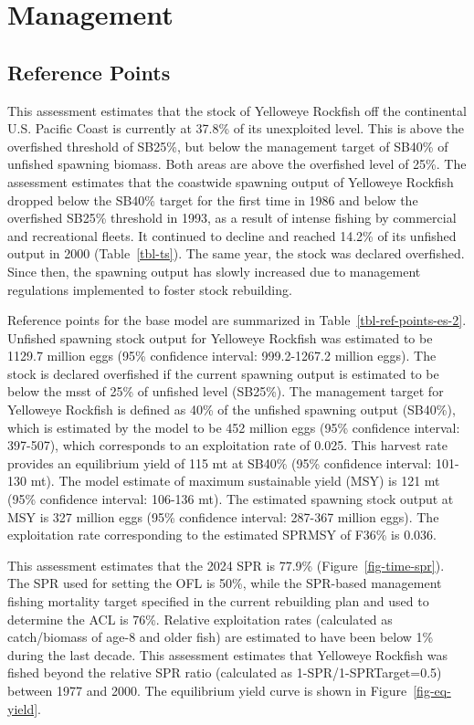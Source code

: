 \documentclass[
]{scrartcl}
\begin{document}
\section{Management}\label{management}

\subsection{Reference Points}\label{reference-points-1}

This assessment estimates that the stock of Yelloweye Rockfish off the
continental U.S. Pacific Coast is currently at 37.8\% of its unexploited
level. This is above the overfished threshold of SB25\%, but below the
management target of SB40\% of unfished spawning biomass. Both areas are
above the overfished level of 25\%. The assessment estimates that the
coastwide spawning output of Yelloweye Rockfish dropped below the SB40\%
target for the first time in 1986 and below the overfished SB25\%
threshold in 1993, as a result of intense fishing by commercial and
recreational fleets. It continued to decline and reached 14.2\% of its
unfished output in 2000 (Table~\ref{tbl-ts}). The same year, the stock
was declared overfished. Since then, the spawning output has slowly
increased due to management regulations implemented to foster stock
rebuilding.

Reference points for the base model are summarized in
Table~\ref{tbl-ref-points-es-2}. Unfished spawning stock output for
Yelloweye Rockfish was estimated to be 1129.7 million eggs (95\%
confidence interval: 999.2-1267.2 million eggs). The stock is declared
overfished if the current spawning output is estimated to be below the
\gls{msst} of 25\% of unfished level (SB25\%). The management target for
Yelloweye Rockfish is defined as 40\% of the unfished spawning output
(SB40\%), which is estimated by the model to be 452 million eggs (95\%
confidence interval: 397-507), which corresponds to an exploitation rate
of 0.025. This harvest rate provides an equilibrium yield of 115 mt at
SB40\% (95\% confidence interval: 101-130 mt). The model estimate of
maximum sustainable yield (MSY) is 121 mt (95\% confidence interval:
106-136 mt). The estimated spawning stock output at MSY is 327 million
eggs (95\% confidence interval: 287-367 million eggs). The exploitation
rate corresponding to the estimated SPRMSY of F36\% is 0.036.

This assessment estimates that the 2024 SPR is 77.9\%
(Figure~\ref{fig-time-spr}). The SPR used for setting the OFL is 50\%,
while the SPR-based management fishing mortality target specified in the
current rebuilding plan and used to determine the ACL is 76\%. Relative
exploitation rates (calculated as catch/biomass of age-8 and older fish)
are estimated to have been below 1\% during the last decade. This
assessment estimates that Yelloweye Rockfish was fished beyond the
relative SPR ratio (calculated as 1-SPR/1-SPRTarget=0.5) between 1977
and 2000. The equilibrium yield curve is shown in
Figure~\ref{fig-eq-yield}.
\end{document}
